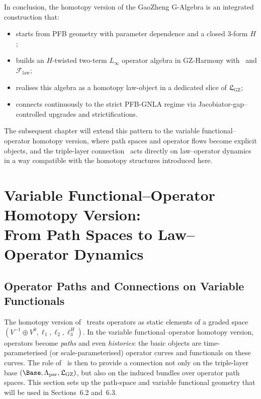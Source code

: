\documentclass[11pt]{book}
\theoremstyle{plain}
\theoremstyle{definition}
\newcommand{\GZLS}{\ensuremath{\mathfrak{L}_{\mathrm{GZ}}}}       \newcommand{\GZLT}{\ensuremath{M_{!w}}}                           \newcommand{\GZLOC}{\ensuremath{A_M}}                             \newcommand{\GZLCurv}{\ensuremath{\mathcal{F}_{\mathrm{law}}}}
\begin{document}
\medskip

In conclusion, the homotopy version of the GaoZheng G-Algebra is an
integrated construction that:

\begin{itemize}
  \item starts from PFB geometry with parameter dependence and a closed
        3-form $H$;
  \item builds an $H$-twisted two-term $L_\infty$ operator algebra in
        GZ-Harmony with \GZTLC\ and \GZLCurv;
  \item realises this algebra as a homotopy law-object in a dedicated
        slice of \GZLS;
  \item connects continuously to the strict PFB-GNLA regime via
        Jacobiator-gap–controlled upgrades and strictifications.
\end{itemize}

The subsequent chapter will extend this pattern to the variable
functional–operator homotopy version, where path spaces and operator
flows become explicit objects, and the triple-layer connection \GZTLC\
acts directly on law–operator dynamics in a way compatible with the
homotopy structures introduced here.



\chapter[Variable Functional–Operator Homotopy Version]{Variable Functional–Operator Homotopy Version:\\
         From Path Spaces to Law–Operator Dynamics}


\section{Operator Paths and Connections on Variable Functionals}


The homotopy version of \GAlgebra\ treats operators as static elements
of a graded space $(V^{-1}\oplus V^0,\ell_1,\ell_2,\ell_3^H)$. In the
variable functional–operator homotopy version, operators become
\emph{paths} and even \emph{histories}: the basic objects are
time-parameterised (or scale-parameterised) operator curves and
functionals on these curves. The role of \GZTLC\ is then to provide a
connection not only on the triple-layer base
$(\Base,\Lambda_{\mathrm{par}},\GZLS)$, but also on the induced bundles
over operator path spaces. This section sets up the path-space and
variable functional geometry that will be used in Sections~6.2 and~6.3.
\end{document}
